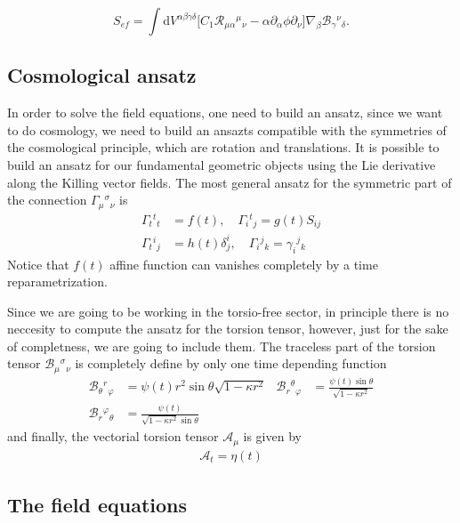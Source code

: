\documentclass[10pt,a4paper]{article}
\begin{document}
\begin{equation*}
    S_{ef} = \int  \mathrm{d}V^{\alpha \beta \gamma \delta} \bigg[ C_1 \mathcal{R}_{\mu\alpha}{}^{\mu}{}_{\nu} - 
    \alpha \partial_{\alpha}\phi \partial_{\nu}\bigg]\nabla_\beta \mathcal{B}_{\gamma}{}^{\nu}{}_{\delta}.
\end{equation*}


\subsection{Cosmological ansatz}

In order to solve the field equations, one need to build an ansatz, since we want to do cosmology, we need to build an ansazts
compatible with the symmetries of the cosmological principle, which are rotation and translations. It is possible to build an ansatz for our
fundamental geometric objects using the Lie derivative along the Killing vector fields. The most general ansatz for the symmetric part of the 
connection $\Gamma_{\mu}{}^{\sigma}{}_{\nu}$ is
\begin{align}
      \Gamma_{t}{}^{t}{ }_{t} & =f(t), \quad \Gamma_{i}{ }^{t}{ }_{j}=g(t) S_{i j} \\
      \Gamma_{t}{ }^{i}{ }_{j} &= h(t) \delta^{i}_{j}, \quad \Gamma_{i}{ }^{j}{ }_{k}= \gamma_{i}{ }^{j}{ }_{k}
\end{align}
Notice that $f(t)$ affine function can vanishes completely by a time reparametrization.

Since we are going to be working in the torsio-free sector, in principle there is no neccesity to compute the ansatz for the torsion tensor, however, just
for the sake of completness, we are going to include them. The traceless part of the torsion tensor $\mathcal{B}_{\mu}{}^{\sigma}{}_{\nu}$ is completely define by only one time depending function
\begin{align*}
    \mathcal{B}_{\theta}{ }^{r}{ }_{\varphi} & = \psi (t) r^2\sin\theta \sqrt{1 - \kappa r^2} &
    \mathcal{B}_{r}{}^{\theta}{}_{\varphi} & =\frac{\psi (t) \sin \theta}{\sqrt{1 - \kappa r^2}} \\
    \mathcal{B}_{r}{}^{\varphi}{}_{\theta} & =\frac{\psi(t)}{ \sqrt{1-\kappa r^{2}} \sin \theta}
\end{align*}
and finally, the vectorial torsion tensor $\mathcal{A}_\mu$ is given by
\begin{align}
    \mathcal{A}_{t} = \eta(t)
\end{align}

\subsection{The field equations}
\end{document}

